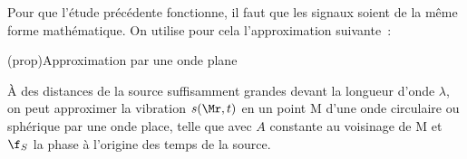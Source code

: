 \documentclass[../../main/main.tex]{subfiles}
\begin{document}
Pour que l'étude précédente fonctionne, il faut que les signaux soient de la
même forme mathématique. On utilise pour cela l'approximation suivante~:

\begin{tcb}[sidebyside, righthand ratio=.4](prop){Approximation par une onde plane}

	À des distances de la source suffisamment grandes devant la longueur
	d'onde $\lambda$, on peut approximer la vibration $s(\Mr,t)$ en un point
	M d'une onde circulaire ou sphérique par une onde place, telle que
	\psw{
		\[\boxed{s(\Mr,t) = A\cos(\wt-k\SMr +\f_S)}\]
	}
	avec $A$ constante au
	voisinage de M et $\f_S$ la phase à l'origine des temps de la source.
	\tcblower
	\begin{center}
	\end{center}
\end{tcb}
\end{document}

